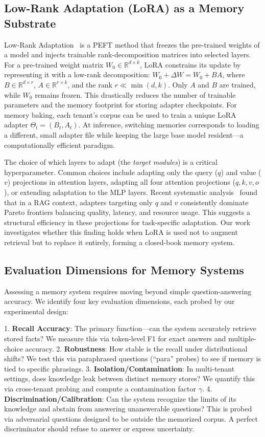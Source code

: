 \documentclass[conference]{IEEEtran}
\begin{document}
\subsection{Low-Rank Adaptation (LoRA) as a Memory Substrate}
Low-Rank Adaptation~\cite{hu2022lora} is a PEFT method that freezes the pre-trained weights of a model and injects trainable rank-decomposition matrices into selected layers. For a pre-trained weight matrix \(W_0 \in \mathbb{R}^{d \times k}\), LoRA constrains its update by representing it with a low-rank decomposition: \(W_0 + \Delta W = W_0 + BA\), where \(B \in \mathbb{R}^{d \times r}\), \(A \in \mathbb{R}^{r \times k}\), and the rank \(r \ll \min(d, k)\). Only \(A\) and \(B\) are trained, while \(W_0\) remains frozen. This drastically reduces the number of trainable parameters and the memory footprint for storing adapter checkpoints. For memory baking, each tenant's corpus can be used to train a unique LoRA adapter \(\Theta_t = (B_t, A_t)\). At inference, switching memories corresponds to loading a different, small adapter file while keeping the large base model resident---a computationally efficient paradigm.

The choice of which layers to adapt (the \textit{target modules}) is a critical hyperparameter. Common choices include adapting only the query (\(q\)) and value (\(v\)) projections in attention layers, adapting all four attention projections (\(q, k, v, o\)), or extending adaptation to the MLP layers. Recent systematic analysis~\cite{qvpareto2026} found that in a RAG context, adapters targeting only \(q\) and \(v\) consistently dominate Pareto frontiers balancing quality, latency, and resource usage. This suggests a structural efficiency in these projections for task-specific adaptation. Our work investigates whether this finding holds when LoRA is used not to augment retrieval but to replace it entirely, forming a closed-book memory system.

\subsection{Evaluation Dimensions for Memory Systems}
Assessing a memory system requires moving beyond simple question-answering accuracy. We identify four key evaluation dimensions, each probed by our experimental design:

1.  \textbf{Recall Accuracy}: The primary function---can the system accurately retrieve stored facts? We measure this via token-level F1 for exact answers and multiple-choice accuracy.
2.  \textbf{Robustness}: How stable is the recall under distributional shifts? We test this via paraphrased questions (``para'' probes) to see if memory is tied to specific phrasings.
3.  \textbf{Isolation/Contamination}: In multi-tenant settings, does knowledge leak between distinct memory stores? We quantify this via cross-tenant probing and compute a contamination factor \(\gamma\).
4.  \textbf{Discrimination/Calibration}: Can the system recognize the limits of its knowledge and abstain from answering unanswerable questions? This is probed via adversarial questions designed to be outside the memorized corpus. A perfect discriminator should refuse to answer or express uncertainty.
\end{document}
